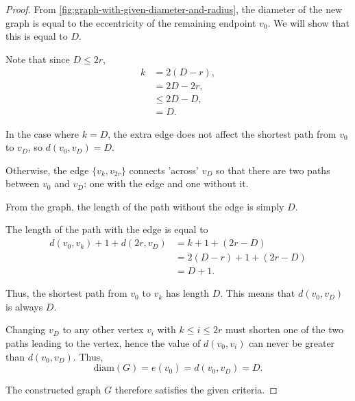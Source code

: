 \begin{enumerate}
\begin{enumerate}
\begin{proof}
                    From \cref{fig:graph-with-given-diameter-and-radius}, the diameter of the new graph is equal to the eccentricity of the remaining endpoint $v_0$.
                    We will show that this is equal to $D$.

                    Note that since $D \le 2r$,
                    \begin{align*}
                        k &= 2(D - r), \\
                        &= 2D - 2r, \\
                        &\le 2D - D, \\
                        &= D.
                    \end{align*}

                    In the case where $k = D$, the extra edge does not affect the shortest path from $v_0$ to $v_D$, so $d(v_0, v_D) = D$.

                    Otherwise, the edge $\{v_k, v_{2r}\}$ connects 'across' $v_D$ so that there are two paths between $v_0$ and $v_D$: one with the edge and one without it.

                    From the graph, the length of the path without the edge is simply $D$.

                    The length of the path with the edge is equal to
                    \begin{align*}
                        d(v_0, v_k) + 1 + d(2r, v_D) &= k + 1 + (2r - D) \\
                        &= 2(D - r) + 1 + (2r - D) \\
                        &= D + 1.
                    \end{align*}

                    Thus, the shortest path from $v_0$ to $v_k$ has length $D$.
                    This means that $d(v_0, v_D)$ is always $D$.

                    Changing $v_D$ to any other vertex $v_i$ with $k \le i \le 2r$ must shorten one of the two paths leading to the vertex, hence the value of $d(v_0, v_i)$ can never be greater than $d(v_0, v_D)$.
                    Thus,
                    \[ \mathrm{diam}(G) = e(v_0) = d(v_0, v_D) = D. \]

                    The constructed graph $G$ therefore satisfies the given criteria.
                \end{proof}

        \end{enumerate}


\end{enumerate}
